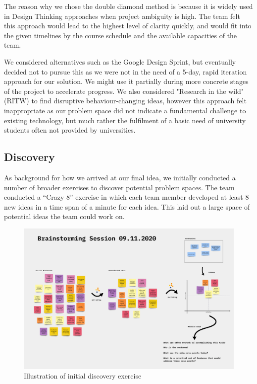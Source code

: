 The reason why we chose the double diamond method is because it is widely used in Design Thinking \cite{interaction_design} approaches when project ambiguity is high. The team felt this approach would lead to the highest level of clarity quickly, and would fit into the given timelines by the course schedule and the available capacities of the team.

We considered alternatives such as the Google Design Sprint, but eventually decided not to pursue this as we were not in the need of a 5-day, rapid iteration approach for our solution. We might use it partially during more concrete stages of the project to accelerate progress. We also considered "Research in the wild" (RITW) to find disruptive behaviour-changing ideas, however this approach felt inappropriate as our problem space did not indicate a fundamental challenge to existing technology, but much rather the fulfilment of a basic need of university students often not provided by universities.

\subsection{Discovery}
As background for how we arrived at our final idea, we initially conducted a number of broader exercises to discover potential problem spaces. The team conducted a ``Crazy 8'' exercise in which each team member developed at least 8 new ideas in a time span of a minute for each idea. This laid out a large space of potential ideas the team could work on.

\begin{figure}[H]
    \centering
    \includegraphics[width=\textwidth]{images/brainstorm.png}
    \caption{Illustration of initial discovery exercise}
    \label{fig:brainstorm}
\end{figure}

